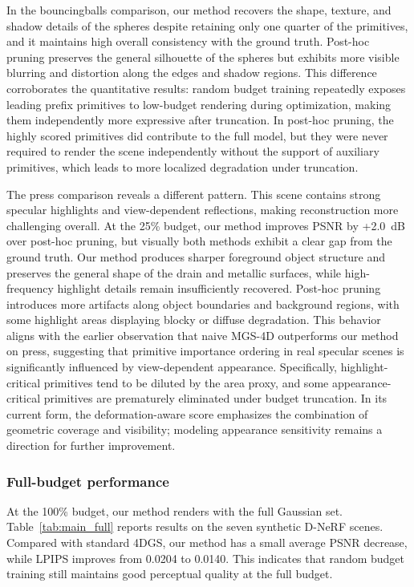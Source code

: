 \documentclass[pdflatex,sn-mathphys]{sn-jnl}
\begin{document}
In the bouncingballs comparison, our method recovers the shape, texture, and shadow details of the spheres despite retaining only one quarter of the primitives, and it maintains high overall consistency with the ground truth. Post-hoc pruning preserves the general silhouette of the spheres but exhibits more visible blurring and distortion along the edges and shadow regions. This difference corroborates the quantitative results: random budget training repeatedly exposes leading prefix primitives to low-budget rendering during optimization, making them independently more expressive after truncation. In post-hoc pruning, the highly scored primitives did contribute to the full model, but they were never required to render the scene independently without the support of auxiliary primitives, which leads to more localized degradation under truncation.

The press comparison reveals a different pattern. This scene contains strong specular highlights and view-dependent reflections, making reconstruction more challenging overall. At the 25\% budget, our method improves PSNR by +2.0~dB over post-hoc pruning, but visually both methods exhibit a clear gap from the ground truth. Our method produces sharper foreground object structure and preserves the general shape of the drain and metallic surfaces, while high-frequency highlight details remain insufficiently recovered. Post-hoc pruning introduces more artifacts along object boundaries and background regions, with some highlight areas displaying blocky or diffuse degradation. This behavior aligns with the earlier observation that naive MGS-4D outperforms our method on press, suggesting that primitive importance ordering in real specular scenes is significantly influenced by view-dependent appearance. Specifically, highlight-critical primitives tend to be diluted by the area proxy, and some appearance-critical primitives are prematurely eliminated under budget truncation. In its current form, the deformation-aware score emphasizes the combination of geometric coverage and visibility; modeling appearance sensitivity remains a direction for further improvement.

\subsubsection{Full-budget performance}

At the 100\% budget, our method renders with the full Gaussian set. Table~\ref{tab:main_full} reports results on the seven synthetic D-NeRF scenes. Compared with standard 4DGS, our method has a small average PSNR decrease, while LPIPS improves from 0.0204 to 0.0140. This indicates that random budget training still maintains good perceptual quality at the full budget.
\end{document}
